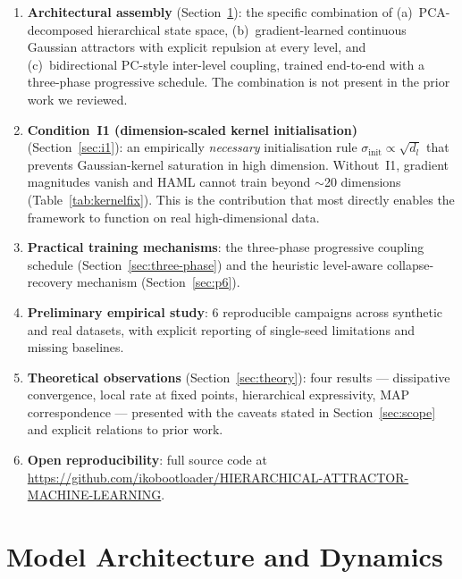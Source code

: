 \documentclass[11pt,a4paper]{article}
\begin{document}
\begin{enumerate}
  \item \textbf{Architectural assembly} (Section~\ref{sec:architecture}): the specific
        combination of (a)~PCA-decomposed hierarchical state space, (b)~gradient-learned
        continuous Gaussian attractors with explicit repulsion at every level, and
        (c)~bidirectional PC-style inter-level coupling, trained end-to-end with a
        three-phase progressive schedule. The combination is not present in the prior
        work we reviewed.
  \item \textbf{Condition~I1 (dimension-scaled kernel initialisation)}
        (Section~\ref{sec:i1}): an empirically \emph{necessary} initialisation rule
        $\sigma_{\mathrm{init}} \propto \sqrt{d_l}$ that prevents Gaussian-kernel
        saturation in high dimension. Without~I1, gradient magnitudes vanish and HAML
        cannot train beyond $\sim$20 dimensions (Table~\ref{tab:kernelfix}). This is
        the contribution that most directly enables the framework to function on
        real high-dimensional data.
  \item \textbf{Practical training mechanisms}: the three-phase progressive coupling
        schedule (Section~\ref{sec:three-phase}) and the heuristic level-aware
        collapse-recovery mechanism (Section~\ref{sec:p6}).
  \item \textbf{Preliminary empirical study}: 6 reproducible campaigns across
        synthetic and real datasets, with explicit reporting of single-seed limitations
        and missing baselines.
  \item \textbf{Theoretical observations} (Section~\ref{sec:theory}): four results
        --- dissipative convergence, local rate at fixed points, hierarchical
        expressivity, MAP correspondence --- presented with the caveats stated in
        Section~\ref{sec:scope} and explicit relations to prior work.
  \item \textbf{Open reproducibility}: full source code at
        \url{https://github.com/ikobootloader/HIERARCHICAL-ATTRACTOR-MACHINE-LEARNING}.
\end{enumerate}

\section{Model Architecture and Dynamics}
\label{sec:architecture}
\end{document}
